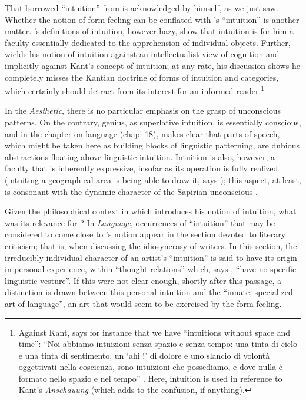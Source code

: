 \documentclass[output=paper]{langscibook}
\begin{document}
That {\Sapir} borrowed ``intuition'' from {\Croce} is acknowledged by {\Sapir} himself, as we just saw. Whether the notion of form-feeling can be conflated with {\Croce}'s ``intuition'' is another matter. {\Croce}'s definitions of intuition, however hazy, show that intuition is for him a faculty essentially dedicated to the apprehension of individual objects. Further, {\Croce} wields his notion of intuition against an intellectualist view of cognition and implicitly against Kant's concept of intuition; at any rate, his discussion shows he completely misses the Kantian doctrine of forms of intuition and categories, which certainly should detract from its interest for an informed reader.\footnote{Against Kant, {\Croce} says for instance that we have ``intuitions without space and time'': ``Noi abbiamo intuizioni senza spazio e senza tempo: una tinta di cielo e una tinta di sentimento, un `ahi !' di dolore e uno slancio di volontà oggettivati nella coscienza, sono intuizioni che possediamo, e dove nulla è formato nello spazio e nel tempo'' \citep[6--7]{Croce1908}. Here, intuition is used in reference to Kant's \emph{Anschauung} (which adds to the confusion, if anything).}

In the \emph{Aesthetic}, there is no particular emphasis on the grasp of unconscious patterns. On the contrary, genius, as superlative intuition, is essentially conscious, and in the chapter on language (chap. 18), {\Croce} makes clear that parts of speech, which might be taken here as building blocks of linguistic patterning, are dubious abstractions floating above linguistic intuition. Intuition is also, however, a faculty that is inherently expressive, insofar as its operation is fully realized (intuiting a geographical area is being able to draw it, says {\Croce}); this aspect, at least, is consonant with the dynamic character of the Sapirian unconscious \citep[see][]{Allen1986}.

Given the philosophical context in which {\Croce} introduces his notion of intuition, what was its relevance for {\Sapir}? In \emph{Language}, occurrences of ``intuition'' that may be considered to come close to {\Croce}'s notion appear in the section devoted to  literary criticism; that is, when discussing the idiosyncrasy of writers. In this section, the irreducibly individual character of an artist's ``intuition'' is said to have its origin in personal experience, within ``thought relations'' which, says \citet[239]{Sapir1921}, ``have no specific linguistic vesture''. If this were not clear enough, shortly after this passage, a distinction is drawn between this personal intuition and the ``innate, specialized art of language'', an art that would seem to be exercised by the form-feeling.
\end{document}
